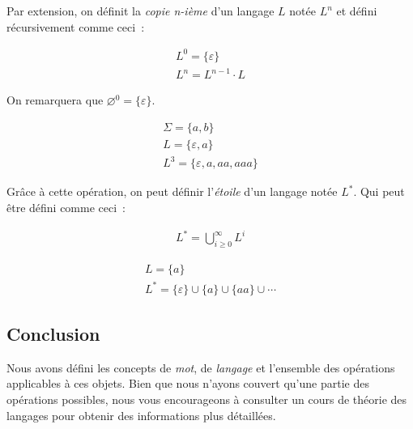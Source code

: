 Par extension, on définit la \textit{copie n-ième} d'un langage \(L\) notée
\(L^n\) et défini récursivement comme ceci~:

\begin{gather}
    L^0 = \{\varepsilon\} \\
    L^n = L^{n - 1} \cdot L
\end{gather}

\noindent On remarquera que \(\varnothing^0 = \{\varepsilon\}\).

\begin{example}
    \begin{gather}
        \Sigma = \{a, b\} \\
        L = \{\varepsilon, a\} \\
        L^3 = \{\varepsilon, a, aa, aaa\}
    \end{gather}
\end{example}

Grâce à cette opération, on peut définir l'\textit{étoile} d'un langage notée
\(L^*\). Qui peut être défini comme ceci~:

\begin{gather}
    L^* = \bigcup_{i \geq 0}^{\infty} L^i
\end{gather}

\begin{example}
    \begin{gather}
        L = \{a\} \\
        L^* = \{\varepsilon\} \cup \{a\} \cup \{aa\} \cup \cdots
    \end{gather}
\end{example}

\subsection{Conclusion}

Nous avons défini les concepts de \textit{mot}, de \textit{langage} et
l'ensemble des opérations applicables à ces objets. Bien que nous n'ayons
couvert qu'une partie des opérations possibles, nous vous encourageons à
consulter un cours de théorie des langages pour obtenir des informations plus
détaillées.